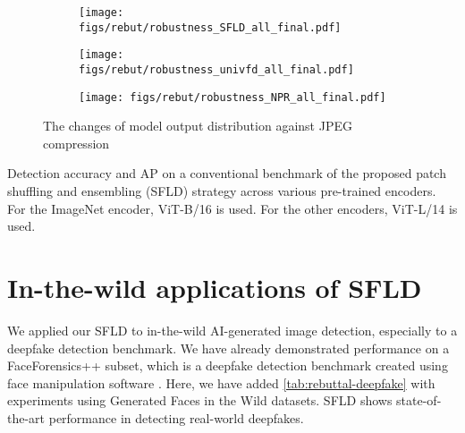 \begin{figure*}[!h]
    \centering
    \begin{subfigure}{0.32\textwidth}
        \centering
        \texttt{[image: figs/rebut/robustness\_SFLD\_all\_final.pdf]}
        \label{fig:robustness_sfld}
    \end{subfigure}
    \begin{subfigure}{0.32\textwidth}
        \centering
        \texttt{[image: figs/rebut/robustness\_univfd\_all\_final.pdf]}
        \label{fig:robustness_univfd}
    \end{subfigure}
    \begin{subfigure}{0.32\textwidth}
        \centering
        \texttt{[image: figs/rebut/robustness\_NPR\_all\_final.pdf]}
        \label{fig:robustness_npr}
    \end{subfigure}
    \caption{The changes of model output distribution against JPEG compression}
    \label{fig:robustness_distribution_jpeg}
\end{figure*}

\begin{table*}[h]
    \centering
    \resizebox{\textwidth}{!}{
        
    }
    \caption{Detection accuracy and AP on a conventional benchmark of the proposed patch shuffling and ensembling (SFLD) strategy across various pre-trained encoders. For the ImageNet encoder, ViT-B/16 is used. For the other encoders, ViT-L/14 is used.}
    \label{tab:rebuttal-encoder}

\end{table*}


\section{In-the-wild applications of SFLD}
\label{sec:suppl_inthewild}

We applied our SFLD to in-the-wild AI-generated image detection, especially to a deepfake detection benchmark.
We have already demonstrated performance on a FaceForensics++\cite{roessler2019faceforensicspp} subset, which is a deepfake detection benchmark created using face manipulation software \cite{Deepfakes}. Here, we have added \cref{tab:rebuttal-deepfake} with experiments using Generated Faces in the Wild\cite{borjiGFW} datasets. SFLD shows state-of-the-art performance in detecting real-world deepfakes. 


